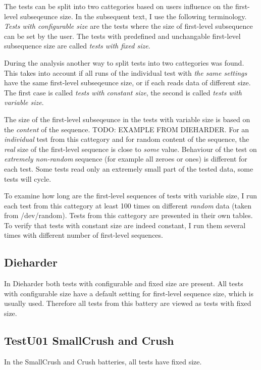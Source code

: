 \documentclass[
  digital,     %
  oneside,     %
  nosansbold,  %
  nocolorbold, %
  nolof,         %
  nolot,         %
]{fithesis4}
\begin{document}
The tests can be split into two cattegories based on users influence on the first-level subseqeunce size. In the subsequent text, I use the following terminology. \emph{Tests with configurable size} are the tests where the size of first-level subsequence can be set by the user. The tests with predefined and unchangable first-level subsequence size are called \emph{tests with fixed size}.

During the analysis another way to split tests into two cattegories was found. This takes into account if all runs of the individual test with \emph{the same settings} have the same first-level subseqeunce size, or if each reads data of different size. The first case is called \emph{tests with constant size}, the second is called \emph{tests with variable size}. 

The size of the first-level subseqeunce in the tests with variable size is based on the \emph{content} of the sequence. TODO: EXAMPLE FROM DIEHARDER. For an \emph{individual} test from this cattegory and for random content of the sequence, the \emph{real} size of the first-level sequence is close to \emph{some} value. Behaviour of the test on \emph{extremely non-random} sequence (for example all zeroes or ones) is different for each test. Some tests read only an extremely small part of the tested data, some tests will cycle.

To examine how long are the first-level sequences of tests with variable size, I run each test from this cattegory at least 100 times on different \emph{random} data (taken from /dev/random). Tests from this cattegory are presented in their own tables. To verify that tests with constant size are indeed constant, I run them several times with different number of first-level sequences.

\subsection{Dieharder}

In Dieharder both tests with configurable and fixed size are present. All tests with configurable size have a default setting for first-level sequence size, which is usually used. Therefore all tests from this battery are viewed as tests with fixed size.

\subsection{TestU01 SmallCrush and Crush}
In the SmallCrush and Crush batteries, all tests have fixed size.
\end{document}
